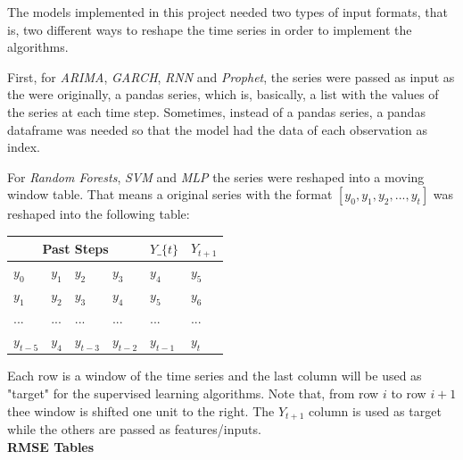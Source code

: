 \documentclass[10pt,twocolumn,letterpaper]{article}
\begin{document}
	The models implemented in this project needed two types of input formats, that is, two different ways to reshape the time series in order to implement the algorithms.
	
	First, for \textit{ARIMA}, \textit{GARCH}, \textit{RNN} and \textit{Prophet}, the series were passed as input as the were originally, a pandas series, which is, basically, a list with the values of the series at each time step. Sometimes, instead of a pandas series, a pandas dataframe was needed so that the model had the data of each observation as index.
	
	For \textit{Random Forests}, \textit{SVM} and \textit{MLP} the series were reshaped into a moving window table. That means a original series with the format $[y_{0},y_{1},y_{2},...,y_{t}]$ was reshaped into the following table:
	
	\begin{table}[h]
		\centering
		\begin{tabular}{|llll|l|l|}
			\hline
			\multicolumn{4}{|c|}{Past Steps}                                                                            &  $Y\_\{t\}$ & $Y_{t+1}$ \\ \hline
			\multicolumn{1}{|l|}{$y_{0}$}   & \multicolumn{1}{l|}{$y_{1}$} & \multicolumn{1}{l|}{$y_{2}$}   & $y_{3}$   & $y_{4}$                & $y_{5}$                \\ \hline
			\multicolumn{1}{|l|}{$y_{1}$}   & \multicolumn{1}{l|}{$y_{2}$} & \multicolumn{1}{l|}{$y_{3}$}   & $y_{4}$   & $y_{5}$                & $y_{6}$                \\ \hline
			\multicolumn{1}{|l|}{...}       & \multicolumn{1}{l|}{...}     & \multicolumn{1}{l|}{...}       & ...       & ...                    & ...                    \\ \hline
			\multicolumn{1}{|l|}{$y_{t-5}$} & \multicolumn{1}{l|}{$y_{4}$} & \multicolumn{1}{l|}{$y_{t-3}$} & $y_{t-2}$ & $y_{t-1}$              & $y_{t}$                \\ \hline
		\end{tabular}
	\end{table}
	
	Each row is a window of the time series and the last column will be used as "target" for the supervised learning algorithms. Note that, from row $i$ to row $i+1$ thee window is shifted one unit to the right. The $Y_{t+1}$ column is used as target while the others are passed as features/inputs.\\
	
	\textbf{RMSE Tables}
	
\end{document}
